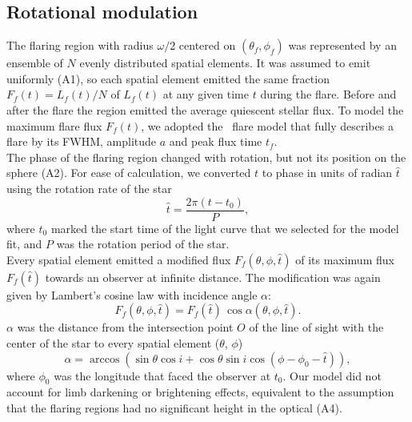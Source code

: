 \documentclass[fleqn,usenatbib,letters]{mnras}%
\begin{document}
\subsection{Rotational modulation}
\label{ssec:rotationalmodulation}
The flaring region with radius $\omega/2$ centered on $(\theta_{f},\phi_{f})$ was represented by an ensemble of $N$ evenly distributed spatial elements. It was assumed to emit uniformly (A1), so each spatial element emitted the same fraction $F_f(t)=L_f(t)/N$ of $L_f(t)$ at any given time $t$ during the flare. Before and after the flare the region emitted the average quiescent stellar flux. To model the maximum flare flux $F_f(t)$, we adopted the~\citet{davenport2014} flare model that fully describes a flare by its FWHM, amplitude $a$ and peak flux time $t_f$.
\\
The phase of the flaring region changed with rotation, but not its position on the sphere (A2). %
For ease of calculation, we converted $t$ to phase in units of radian $\hat t$ using the rotation rate of the star
\begin{equation}
\hat t = \dfrac{2\pi(t - t_{0})}{P},
\end{equation}
where $t_{0}$ marked the start time of the light curve that we selected for the model fit, and $P$ was the rotation period of the star.
\\
Every spatial element emitted a modified flux $F_f(\theta,\phi,\hat t)$ of its maximum flux $F_f(\hat t)$ towards an observer at infinite distance. The modification was again given by Lambert's cosine law with incidence angle $\alpha$:
\begin{equation}
   F_f(\theta,\phi,\hat t) = F_{f}(\hat t)\,\cos\alpha(\theta,\phi,\hat t).
 	\label{eq:lambert1}
\end{equation}
$\alpha$ was the distance from the intersection point $O$ of the line of sight with the center of the star to every spatial element ($\theta$, $\phi$)
\begin{equation}
    \alpha = \arccos\left(\sin\theta \cos i + \cos\theta \sin i \cos(\phi - \phi_0 - \hat t)\right),
    \label{eq:alpha}
\end{equation}
where $\phi_0$ was the longitude that faced the observer at $t_{0}$. Our model did not account for limb darkening or brightening effects, equivalent to the assumption that the flaring regions had no significant height in the optical (A4).%
\end{document}
